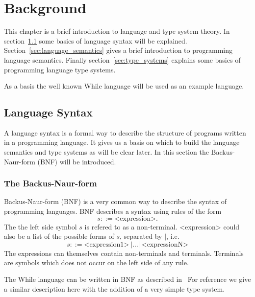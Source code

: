 \chapter{Background} \label{cha:background}

This chapter is a brief introduction to language and type system theory. In
section~\ref{sec:language_syntax} some basics of language syntax will be
explained. Section~\ref{sec:language_semantics} gives a brief introduction to
programming language semantics. Finally section~\ref{sec:type_systems} explains
some basics of programming language type systems.

As a basis the well known While language will be used as an example language.

\section{Language Syntax} \label{sec:language_syntax}

A language syntax is a formal way to describe the structure of programs written
in a programming language. It gives us a basis on which to build the language
semantics and type systems as will be clear later. In this section the
Backus-Naur-form (BNF) will be introduced. 

\subsection{The Backus-Naur-form} \label{sub:the_backus_naur_form} 

Backus-Naur-form (BNF) is a very common way to describe the syntax of
programming languages. BNF describes a syntax using rules of the form
\begin{equation*}
  s ::= \text{<expression>}.
\end{equation*}
The the left side symbol $s$ is refered to as a non-terminal. <expression> could
also be a list of the
possible forms of $s$, separated by $|$, i.e. 
\begin{equation*}
  s ::= \text{<expression1>} \: | \dots | \: \text{<expressionN>}
\end{equation*}
The expressions can themselves contain non-terminals and terminals.
Terminals are symbols which does not occur on the left side of any rule.

The While language can be written in BNF as described in~\cite{} %
For reference we give a similar description here with the addition of a very
simple type system.

